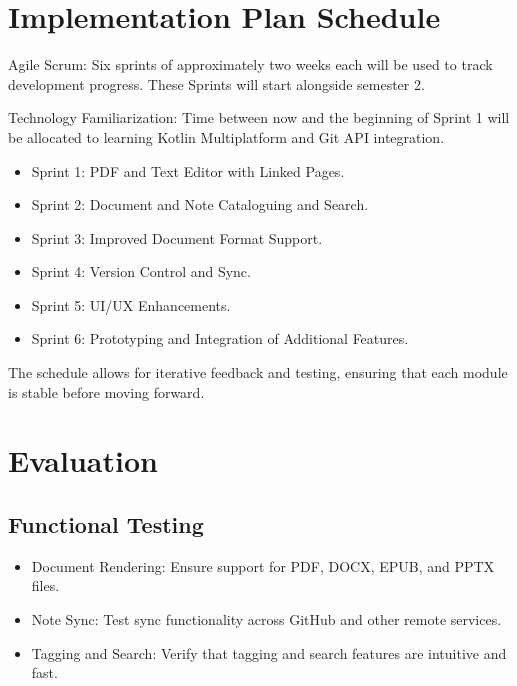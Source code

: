 \section{Implementation Plan Schedule}
Agile Scrum: Six sprints of approximately two weeks each will be used to track development progress. These Sprints will start alongside semester 2. 

Technology Familiarization: Time between now and the beginning of Sprint 1 will be allocated to learning Kotlin Multiplatform and Git API integration.

\begin{itemize}
    \item Sprint 1: PDF and Text Editor with Linked Pages.
    \item Sprint 2: Document and Note Cataloguing and Search.
    \item Sprint 3: Improved Document Format Support.
    \item Sprint 4: Version Control and Sync.
    \item Sprint 5: UI/UX Enhancements.
    \item Sprint 6: Prototyping and Integration of Additional Features.
   
\end{itemize}

The schedule allows for iterative feedback and testing, ensuring that each module is stable before moving forward.

\section{Evaluation}
\subsection{Functional Testing}
\begin{itemize}
    \item Document Rendering: Ensure support for PDF, DOCX, EPUB, and PPTX files.
    \item Note Sync: Test sync functionality across GitHub and other remote services.
    \item Tagging and Search: Verify that tagging and search features are intuitive and fast.
\end{itemize}

